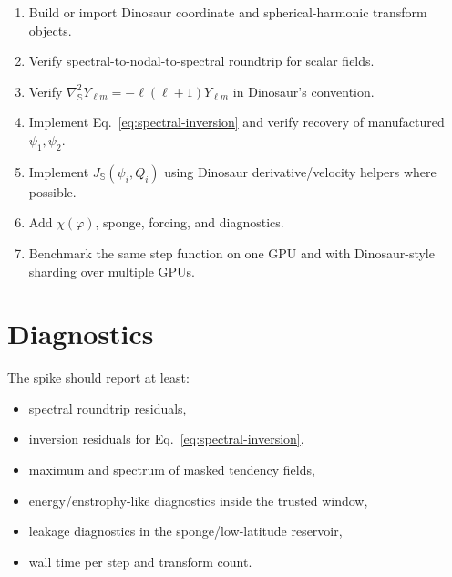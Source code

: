 \documentclass[11pt]{article}
\newcommand{\lapS}{\nabla_{\mathbb{S}}^{2}}
\newcommand{\jacS}{J_{\mathbb{S}}}
\newcommand{\Ylm}{Y_{\ell m}}
\newcommand{\chiM}{\chi}
\begin{document}
\begin{enumerate}[leftmargin=2em]
  \item Build or import Dinosaur coordinate and spherical-harmonic transform
  objects.
  \item Verify spectral-to-nodal-to-spectral roundtrip for scalar fields.
  \item Verify $\lapS \Ylm = -\ell(\ell+1)\Ylm$ in Dinosaur's convention.
  \item Implement Eq.~\eqref{eq:spectral-inversion} and verify recovery of
  manufactured $\psi_1,\psi_2$.
  \item Implement $\jacS(\psi_i,Q_i)$ using Dinosaur derivative/velocity
  helpers where possible.
  \item Add $\chiM(\varphi)$, sponge, forcing, and diagnostics.
  \item Benchmark the same step function on one GPU and with Dinosaur-style
  sharding over multiple GPUs.
\end{enumerate}

\section{Diagnostics}

The spike should report at least:
\begin{itemize}[leftmargin=2em]
  \item spectral roundtrip residuals,
  \item inversion residuals for Eq.~\eqref{eq:spectral-inversion},
  \item maximum and spectrum of masked tendency fields,
  \item energy/enstrophy-like diagnostics inside the trusted window,
  \item leakage diagnostics in the sponge/low-latitude reservoir,
  \item wall time per step and transform count.
\end{itemize}
\end{document}
